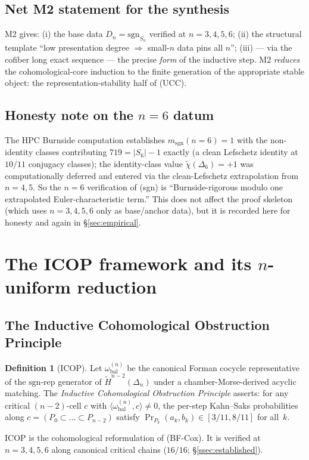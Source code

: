 \documentclass[11pt,reqno]{amsart}
\theoremstyle{plain}
\theoremstyle{definition}
\newtheorem{definition}[theorem]{Definition}
\newcommand{\Hred}{\widetilde H}
\newcommand{\chired}{\widetilde\chi}
\newcommand{\sgn}{\mathrm{sgn}}
\newcommand{\omegabal}[1]{\omega_{\mathrm{bal}}^{(#1)}}
\newcommand{\UCC}{\textup{(UCC)}}
\begin{document}
\subsection{Net M2 statement for the synthesis}\label{ssec:4.4}
M2 gives: (i) the base data $D_n=\sgn_{S_n}$ verified at $n=3,4,5,6$;
(ii) the structural template ``low presentation degree $\Rightarrow$
small-$n$ data pins all $n$''; (iii) --- via the cofiber long exact
sequence --- the precise \emph{form} of the inductive step. M2
\emph{reduces} the cohomological-core induction to the finite generation
of the appropriate stable object: the representation-stability half of
\UCC.

\subsection{Honesty note on the $n=6$ datum}\label{ssec:n6note}
The HPC Burnside computation establishes $m_{\sgn}(n{=}6)=1$ with the
non-identity classes contributing $719=|S_6|-1$ exactly (a clean
Lefschetz identity at $10/11$ conjugacy classes); the identity-class
value $\chired(\Delta_6)=+1$ was computationally deferred and entered
via the clean-Lefschetz extrapolation from $n=4,5$. So the $n=6$
verification of (sgn) is ``Burnside-rigorous modulo one extrapolated
Euler-characteristic term.'' This does not affect the proof skeleton
(which uses $n=3,4,5,6$ only as base/anchor data), but it is recorded
here for honesty and again in \S\ref{sec:empirical}.

\section{The ICOP framework and its $n$-uniform reduction}\label{sec:ICOP}

\subsection{The Inductive Cohomological Obstruction Principle}\label{ssec:5.1}
\begin{definition}[ICOP]\label{def:icop}
Let $\omegabal n$ be the canonical Forman cocycle representative of the
$\sgn$-rep generator of $\Hred^{n-2}(\Delta_n)$ under a
chamber-Morse-derived acyclic matching. The \emph{Inductive
Cohomological Obstruction Principle} asserts: for any critical
$(n-2)$-cell $c$ with $\langle\omegabal n,c\rangle\ne0$, the per-step
Kahn--Saks probabilities along $c=(P_0\subset\dots\subset P_{n-2})$
satisfy $\Pr_{P_k}(a_k,b_k)\in[3/11,8/11]$ for all~$k$.
\end{definition}
ICOP is the cohomological reformulation of (BF-Cox). It is verified at
$n=3,4,5,6$ along canonical critical chains ($16/16$; \S\ref{ssec:established}).
\end{document}
